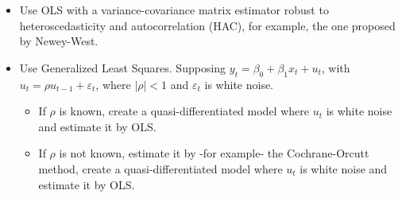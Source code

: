 \documentclass[10pt, a4paper, landscape]{article}
\begin{document}
\begin{multicols}{3}
\begin{itemize}[leftmargin=*]
	\item Use OLS with a variance-covariance matrix estimator robust to heteroscedasticity and autocorrelation (HAC), for example, the one proposed by Newey-West.
	\item Use Generalized Least Squares. Supposing \( y_{t} = \beta_{0} + \beta_{1} x_{t} + u_{t} \), with \( u_{t} = \rho u_{t - 1} + \varepsilon_{t} \), where \( \lvert \rho \rvert < 1 \) and \( \varepsilon_{t} \) is white noise.
	\begin{itemize}[leftmargin=*]
		\item If \( \rho \) is known, create a quasi-differentiated model where \( u_{t} \) is white noise and estimate it by OLS.
		\item If \( \rho \) is not known, estimate it by -for example- the Cochrane-Orcutt method, create a quasi-differentiated model where \( u_{t} \) is white noise and estimate it by OLS.
	\end{itemize}
\end{itemize}

\end{multicols}
\end{document}
